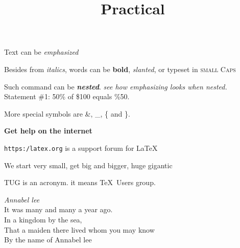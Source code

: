 \documentclass{article}
\begin{document}
	
		\title{Practical }
		 
	Text can be \emph{emphasized}
	
	Besides from \textit{italics}, words can be 
	\textbf{bold}, \textsl{slanted}, or typeset
	in \textsc {small Caps}
	
	Such command can be \textit{\textbf{nested}}.
	\emph{see how \emph{emphasizing} looks when nested.} \\

	
	Statement \#1:
	50\% of \$100 equals \%50.
	
	More special symbols are \&, \_, \{ and \}.
	
	
	\textsf{\textbf{Get help on the internet}}
	
	\texttt{https:/latex.org} is a support forum for \LaTeX

	
	\tiny We \scriptsize start \footnotesize very 
	\small small, \normalsize get \large big \Large and 
	\LARGE bigger, \huge huge \Huge gigantic \\
	
	
	\begin{minipage} {5cm}
		TUG is an acronym. it means \TeX\ Users group. \\
	\end{minipage}

	\noindent\emph{Annabel lee}\\
	It was many and many a year ago. \\
	In a kingdom by the sea, \\
	That a maiden there lived whom you may know \\
	By the name of Annabel lee
	
	
	
	
			
\end{document}
